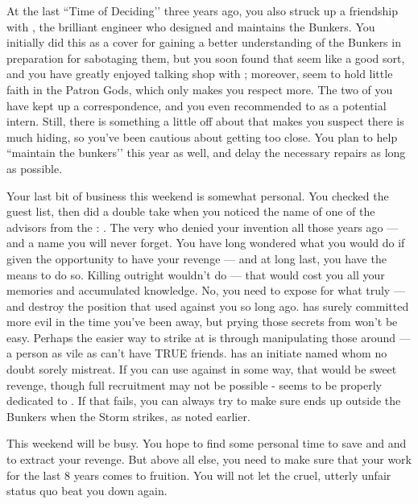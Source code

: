 \documentclass[char]{GL2020}
\begin{document}
At the last ``Time of Deciding’’ three years ago, you also struck up a friendship with \cBunker{\full}, the brilliant engineer who designed and maintains the Bunkers. You initially did this as a cover for gaining a better understanding of the Bunkers in preparation for sabotaging them, but you soon found that \cBunker{\they} seem\cBunker{\verbs} like a good sort, and you have greatly enjoyed talking shop with \cBunker{\them}; moreover, \cBunker{\they} seem\cBunker{\verbs} to hold little faith in the Patron Gods, which only makes you respect \cBunker{\them} more. The two of you have kept up a correspondence, and you even recommended \cTechStar{} to \cTechStar{\them} as a potential intern. Still, there is something a little off about \cBunker{} that makes you suspect there is much \cBunker{\they} \cBunker{\are} hiding, so you've been cautious about getting too close. You plan to help \cBunker{\them} ``maintain the bunkers’’ this year as well, and delay the necessary repairs as long as possible.

Your last bit of business this weekend is somewhat personal. You checked the guest list, then did a double take when you noticed the name of one of the advisors from the \pTech{}: \cAntiChup{\full}. The very \cAntiChup{\cleric} who denied your invention all those years ago — and a name you will never forget. You have long wondered what you would do if given the opportunity to have your revenge — and at long last, you have the means to do so. Killing \cAntiChup{} outright wouldn't do — that would cost you all your memories and accumulated knowledge. No, you need to expose \cAntiChup{\them} for what \cAntiChup{\they} truly \cAntiChup{\are} — and destroy the position that \cAntiChup{\they} used against you so long ago. \cAntiChup{} has surely committed more evil in the time you've been away, but prying those secrets from \cAntiChup{\them} won't be easy. Perhaps the easier way to strike at \cAntiChup{\them} is through manipulating those around \cAntiChup{\them} — a person as vile as \cAntiChup{} can't have TRUE friends. \cAntiChup{} has an initiate named \cScholarship{\full} whom \cAntiChup{\they} no doubt sorely mistreat\cAntiChup{\verbs}. If you can use \cScholarship{\them} against \cAntiChup{\them} in some way, that would be sweet revenge, though full recruitment may not be possible - \cScholarship{} seems to be properly dedicated to \cTechGod{}. If that fails, you can always try to make sure  \cAntiChup{} ends up outside the Bunkers when the Storm strikes, as noted earlier. 

This weekend will be busy. You hope to find some personal time to save \cHeadScientist{} and \cTechStar{} and to extract your revenge. But above all else, you need to make sure that your work for the last 8 years comes to fruition. You will not let the cruel, utterly unfair status quo beat you down again.
\end{document}
